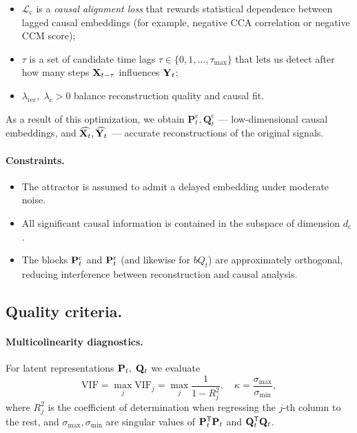 \documentclass[14pt]{extarticle}
\begin{document}
	\begin{itemize}[leftmargin=1.4cm]
		\item $\mathcal L_{\mathrm c}$ is a \emph{causal alignment loss} that rewards statistical dependence between lagged causal embeddings  
		(for example, negative CCA correlation or negative CCM score);
		\item $\tau$ is a set of candidate time lags  
		$\tau \in \{0,1,\dots,\tau_{\max}\}$ that lets us detect after how many steps $\mathbf{X}_{t - \tau}$ influences $\mathbf{Y}_t$;
		\item $\lambda_{\mathrm{rec}}, \; \lambda_{\mathrm{c}}>0$ balance reconstruction quality and causal fit.
	\end{itemize}
	
	As a result of this optimization, we obtain
	$\mathbf P_t^{\mathrm c}, \mathbf Q_t^{\mathrm c}$ — low-dimensional causal embeddings, and 
	$\widehat{\mathbf{X}_t}, \widehat{\mathbf{Y}_t}$ — accurate reconstructions of the original signals.
	
	\paragraph{Constraints.}
	\begin{itemize}[nosep,leftmargin=1.2cm]
		\item The attractor is assumed to admit a delayed embedding under moderate noise.
		\item All significant causal information is contained in the subspace of dimension $d_{\mathrm c}$.
		\item The blocks $\mathbf{P}^{\mathrm c}_t$ and $\mathbf{P}^{\mathrm r}_t$ 
		(and likewise for $bQ_t$) are approximately orthogonal, reducing interference between reconstruction and causal analysis.
	\end{itemize}
	
	\subsection{Quality criteria.} \label{subsec:quality}
	\paragraph{Multicolinearity diagnostics.}
	For latent representations  $\mathbf{P}_t, \; \mathbf{Q}_t$
	we evaluate 
	\[
	\text{VIF} = \max_{j} \text{VIF}_j = \max_{j}\frac{1}{1-R_j^{2}},
	\quad
	\kappa = \frac{\sigma_{\max}}{\sigma_{\min}},
	\]
	where $R_j^{2}$ is the coefficient of determination when
	regressing the $j$-th column to the rest,
	and $\sigma_{\max},\sigma_{\min}$ are singular values
	of $\mathbf{P}_t^{\mathsf{T}} \mathbf{P}_t$ and $\mathbf{Q}_t^{\mathsf{T}} \mathbf{Q}_t$.
	
\end{document}
